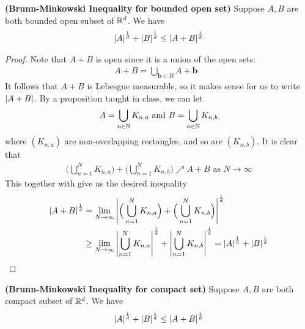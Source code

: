 \documentclass{report}
\begin{document}
\begin{theorem}
\label{BMIo}
\textbf{(Brunn-Minkowski Inequality for bounded open set)} Suppose $A,B$ are both bounded open subset of  $\mathbb{R}^d$. We have 
 \begin{align*}
\left|A\right|^{\frac{1}{d}}+ \left|B\right|^{\frac{1}{d}}\leq \left|A+B\right|^{\frac{1}{d}}
\end{align*}
\end{theorem}
\begin{proof}
Note that  $A+B$ is open since it is a union of the open sets:
\begin{align*}
A+B=\bigcup_{\textbf{b}\in B}A+\textbf{b}\text{ }
\end{align*}
It follows that $A+B$ is Lebesgue measurable, so it makes sense for us to write  $\left|A+B\right|$. By a proposition taught in class, we can let 
\begin{align*}
A=\bigcup_{n\in\mathbb{N}}K_{n,a}\text{ and }B=\bigcup_{n\in\mathbb{N}}K_{n,b}
\end{align*}
where $(K_{n,a})$ are non-overlapping rectangles, and so are $(K_{n,b})$. It is clear that  
\begin{align*}
  \Big(\bigcup_{n=1}^N K_{n,a} \Big) + \Big(\bigcup_{n=1}^N K_{n,b} \Big) \nearrow A+B\text{ as }N \to \infty
\end{align*}
This together with  give us the desired inequality  
\begin{align*}
\left|A+B\right|^{\frac{1}{d}}&=\lim_{N\to \infty} \left|\Big(\bigcup_{n=1}^N K_{n,a} \Big) + \Big( \bigcup_{n=1}^N K_{n,b}  \Big)\right|^{\frac{1}{d}}\\
&\geq \lim_{N\to \infty} \left|\bigcup_{n=1}^N K_{n,a}\right|^{\frac{1}{d}}+ \left|\bigcup_{n=1}^N K_{n,b}\right|^{\frac{1}{d}}=\left|A\right|^{\frac{1}{d}}+\left|B\right|^{\frac{1}{d}}
\end{align*}
\end{proof}
\begin{theorem}
\label{BMIc}
\textbf{(Brunn-Minkowski Inequality for compact set)} Suppose $A,B$ are both compact subset of  $\mathbb{R}^d$. We have 
 \begin{align*}
\left|A\right|^{\frac{1}{d}}+ \left|B\right|^{\frac{1}{d}}\leq  \left|A+B\right|^{\frac{1}{d}}
\end{align*}
\end{theorem}
\end{document}
